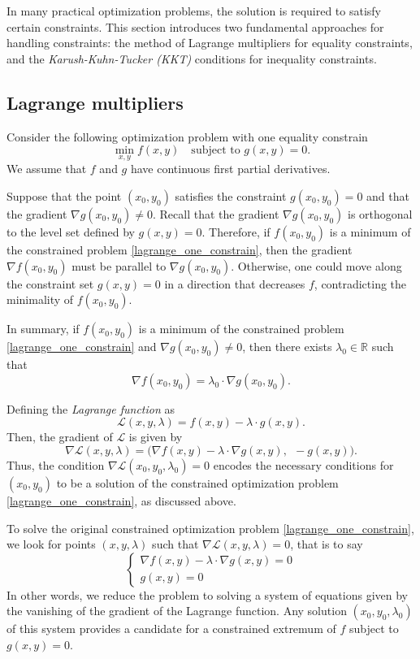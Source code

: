 \documentclass{amsart}
\newcommand{\R}{\mathbb{R}}
\begin{document}
In many practical optimization problems, the solution is required to satisfy certain constraints. This section introduces two fundamental approaches for handling constraints: the method of Lagrange multipliers for equality constraints, and the {\it Karush-Kuhn-Tucker (KKT)} conditions for inequality constraints.

\subsection{Lagrange multipliers}

Consider the following optimization problem with one equality constrain
\begin{equation}
    \label{lagrange_one_constrain}
    \min_{x,y} f(x,y) \quad \text{subject to } g(x,y)= 0.
\end{equation}
We assume that $f$ and $g$ have continuous first partial derivatives.

\bigskip

Suppose that the point $(x_0,y_0)$ satisfies  the constraint $g(x_0,y_0)=0$ and that the gradient $\nabla g(x_0,y_0)\neq 0$. Recall that the gradient $\nabla g(x_0,y_0)$ is orthogonal to the level set defined by $g(x,y)=0$. Therefore, if $f(x_0,y_0)$ is a minimum of the constrained problem \eqref{lagrange_one_constrain}, then the gradient $\nabla f(x_0,y_0)$ must be parallel to $\nabla g(x_0,y_0)$. Otherwise, one could move along the constraint set $g(x,y)=0$ in a direction that decreases $f$, contradicting the minimality of $f(x_0,y_0)$.

In summary, if $f(x_0,y_0)$ is a minimum of the constrained problem \eqref{lagrange_one_constrain} and $\nabla g(x_0,y_0)\neq 0$, then there exists $\lambda_0\in\R$ such that
\[
    \nabla f(x_0,y_0)= \lambda_0\cdot \nabla g(x_0,y_0).
\]

\bigskip

Defining the {\it Lagrange function} as
\[
    \mathcal{L}(x,y,\lambda)= f(x,y) -\lambda\cdot g(x,y).
\]
Then, the gradient of $\mathcal{L}$ is given by
\[
    \nabla\mathcal{L}(x,y,\lambda)=
    \Big(
        \nabla f(x,y) -\lambda\cdot \nabla g(x,y),\ \
        -g(x,y)
    \Big).
\]
Thus, the condition $\nabla\mathcal{L}(x_0,y_0,\lambda_0)=0$ encodes the necessary conditions for $(x_0,y_0)$ to be a solution of the constrained optimization problem \eqref{lagrange_one_constrain}, as discussed above.

\bigskip

To solve the original constrained optimization problem \eqref{lagrange_one_constrain}, we look for points $(x,y,\lambda)$ such that $\nabla\mathcal{L}(x,y,\lambda)=0$, that is to say
\[\begin{cases}
    \nabla f(x,y) -\lambda\cdot \nabla g(x,y)= 0\\
    g(x,y)= 0
\end{cases}\]
In other words, we reduce the problem to solving a system of equations given by the vanishing of the gradient of the Lagrange function. Any solution $(x_0,y_0,\lambda_0)$ of this system provides a candidate for a constrained extremum of $f$ subject to $g(x,y)=0$.
\end{document}

